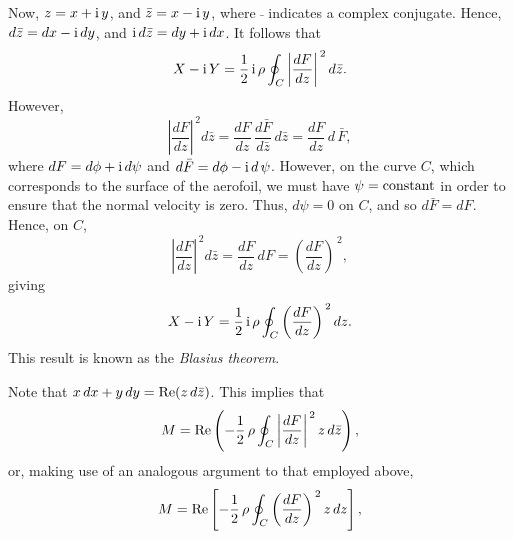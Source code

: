 Now, $z=x+{\rm i}\,y$, and $\bar{z}=x-{\rm i}\,y$, where $\bar{~}$ indicates a complex conjugate.
Hence, $d\bar{z} = dx -{\rm i}\,dy$, and ${\rm i}\,d\bar{z} = dy+{\rm i}\,dx$.  It follows that
\begin{equation}
X - {\rm i}\,Y = \frac{1}{2}\,{\rm i}\,\rho\oint_C \left|\frac{dF}{dz}\right|^{\,2}d\bar{z}.
\end{equation}
However,
\begin{equation}
 \left|\frac{dF}{dz}\right|^{\,2}d\bar{z} = \frac{dF}{dz}\,\frac{d\bar{F}}{d\bar{z}}\,d\bar{z} = \frac{dF}{dz}\,d\,\bar{F},
 \end{equation}
 where $dF = d\phi+{\rm i}\,d\psi$ and $d\bar{F}=d\phi-{\rm i}\,d\,\psi$. However, on the curve $C$,
 which corresponds to the surface of the aerofoil, we must have $\psi={\rm constant}$ in order to ensure that
 the normal velocity is zero. Thus, $d\psi=0$ on $C$, and so $d\bar{F}=dF$. 
 Hence,  on $C$, 
\begin{equation}
 \left|\frac{dF}{dz}\right|^{\,2}d\bar{z} =  \frac{dF}{dz}\,dF = \left(\frac{dF}{dz}\right)^{\,2},
 \end{equation}
 giving
 \begin{equation}\label{ep7.65}
X - {\rm i}\,Y = \frac{1}{2}\,{\rm i}\,\rho\oint_C \left(\frac{dF}{dz}\right)^{\,2}dz.
\end{equation}
This result is known as the {\em Blasius theorem}. 

Note that $x\,dx+ y\,dy={\rm Re}(z\,d\bar{z})$. This implies that
\begin{equation}
M = {\rm Re}\left(-\frac{1}{2}\,\rho \oint_C \left|\frac{dF}{dz}\right|^{\,2} z\,d\bar{z}\right),
\end{equation}
or, making use of an analogous argument to that employed above, 
\begin{equation}\label{ep7.67}
M = {\rm Re}\left[-\frac{1}{2}\,\rho \oint_C \left(\frac{dF}{dz}\right)^{\,2} z\,dz\right],
\end{equation}
 
